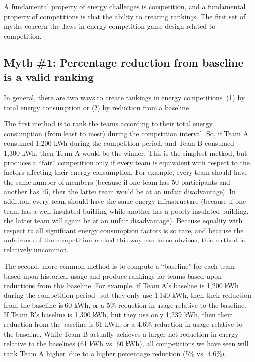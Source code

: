 \documentclass[jou]{apa} %
\begin{document}
A fundamental property of energy challenges is competition, and a fundamental property of
competitions is that the ability to creating rankings.   The first set of myths concern 
the flaws in energy competition game design related to competition.


\subsection{Myth \#1: Percentage reduction from baseline is a valid ranking}

In general, there are two ways to create rankings in energy competitions: (1) by total
energy consumption or (2) by reduction from a baseline.

The first method is to rank the teams according to their total energy consumption (from
least to most) during the competition interval.  So, if Team A consumed 1,200 kWh during
the competition period, and Team B consumed 1,300 kWh, then Team A would be the
winner. This is the simplest method, but produces a ``fair'' competition only if every
team is equivalent with respect to the factors affecting their energy consumption.  For
example, every team should have the same number of members (because if one team has 50
participants and another has 75, then the latter team would be at an unfair disadvantage).
In addition, every team should have the same energy infrastructure (because if one team
has a well insulated building while another has a poorly insulated building, the latter
team will again be at an unfair disadvantage).  Because equality with respect to all
significant energy consumption factors is so rare, and because the unfairness of the
competition ranked this way can be so obvious, this method is relatively uncommon.

The second, more common method is to compute a ``baseline'' for each team based upon
historical usage and produce rankings for teams based upon reductions from this baseline.
For example, if Team A's baseline is 1,200 kWh during the competition period, but they
only use 1,140 kWh, then their reduction from the baseline is 60 kWh, or a 5\% reduction
in usage relative to the baseline.  If Team B's baseline is 1,300 kWh, but they use only
1,239 kWh, then their reduction from the baseline is 61 kWh, or a 4.6\% reduction in usage
relative to the baseline.  While Team B actually achieves a larger net reduction in energy
relative to the baselines (61 kWh vs. 60 kWh), all competitions we have seen will rank
Team A higher, due to a higher percentage reduction (5\% vs. 4.6\%).
\end{document}
